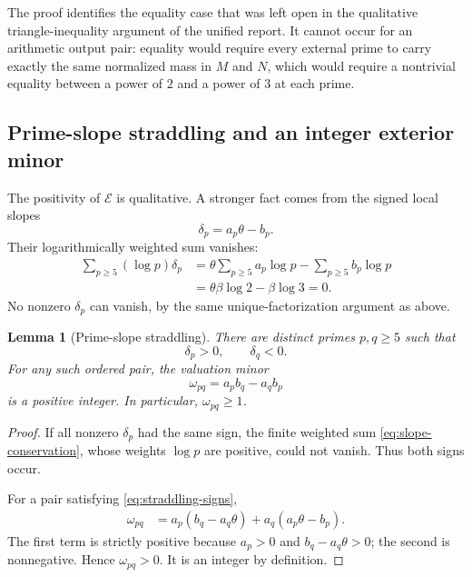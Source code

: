 \documentclass[11pt,oneside]{article}
\theoremstyle{research}
\newtheorem{lemma}[theorem]{Lemma}
\theoremstyle{definition}
\newcommand{\E}{\mathcal E}
\begin{document}
The proof identifies the equality case that was left open in the qualitative
triangle-inequality argument of the unified report.  It cannot occur for an
arithmetic output pair: equality would require every external prime to carry
exactly the same normalized mass in $M$ and $N$, which would require a
nontrivial equality between a power of $2$ and a power of $3$ at each prime.

\subsection{Prime-slope straddling and an integer exterior minor}

The positivity of $\E$ is qualitative.  A stronger fact comes from the signed
local slopes
\begin{equation}
 \delta_p=a_p\theta-b_p.
 \label{eq:delta-p}
\end{equation}
Their logarithmically weighted sum vanishes:
\begin{align}
 \sum_{p\ge5}(\log p)\delta_p
 &=\theta\sum_{p\ge5}a_p\log p
   -\sum_{p\ge5}b_p\log p \\
 &=\theta\beta\log2-\beta\log3=0.
 \label{eq:slope-conservation}
\end{align}
No nonzero $\delta_p$ can vanish, by the same unique-factorization argument as
above.

\begin{lemma}[Prime-slope straddling]
\label{lem:prime-slope-straddling}
There are distinct primes $p,q\ge5$ such that
\begin{equation}
 \delta_p>0,
 \qquad
 \delta_q<0.
 \label{eq:straddling-signs}
\end{equation}
For any such ordered pair, the valuation minor
\begin{equation}
 \omega_{pq}
 =a_pb_q-a_qb_p
 \label{eq:omega-def}
\end{equation}
is a positive integer.  In particular, $\omega_{pq}\ge1$.
\end{lemma}

\begin{proof}
If all nonzero $\delta_p$ had the same sign, the finite weighted sum
\eqref{eq:slope-conservation}, whose weights $\log p$ are positive, could not
vanish.  Thus both signs occur.

For a pair satisfying \eqref{eq:straddling-signs},
\begin{align}
 \omega_{pq}
 &=a_p(b_q-a_q\theta)+a_q(a_p\theta-b_p).
 \label{eq:omega-positive-decomposition}
\end{align}
The first term is strictly positive because $a_p>0$ and
$b_q-a_q\theta>0$; the second is nonnegative.  Hence
$\omega_{pq}>0$.  It is an integer by definition.
\end{proof}
\end{document}
